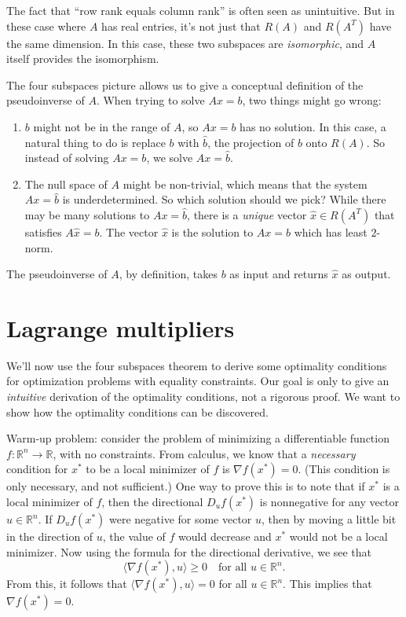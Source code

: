 \documentclass{article}
\begin{document}
The fact that ``row rank equals column rank'' is often seen as unintuitive.
But in these case where $A$ has real entries, it's not just that
$R(A)$ and $R(A^T)$ have the same dimension.  In this case,
these two subspaces are \emph{isomorphic}, and $A$ itself provides 
the isomorphism.

The four subspaces picture allows us to give a conceptual definition
of the pseudoinverse of $A$.
When trying to solve $Ax = b$, two things might go wrong:
\begin{enumerate}
\item
$b$ might not be in the range of $A$, so $Ax = b$
has no solution.  In this case, a natural thing to do
is replace $b$ with $\hat{b}$, the projection of $b$ onto $R(A)$.
So instead of solving $Ax = b$, we solve $Ax = \hat{b}$.
\item
The null space of $A$ might be non-trivial,
which means that the system $Ax = \hat{b}$ is underdetermined.
So which solution should we pick?  
While there may be many solutions to $Ax = \hat{b}$,
there is a \emph{unique} vector $\hat{x} \in R(A^T)$
that satisfies $A\hat{x} = b$.
The vector $\hat{x}$ is the solution to $Ax = b$ which has
least $2$-norm.
\end{enumerate}
The pseudoinverse of $A$, by definition,
takes $b$ as input and returns $\hat{x}$ as output.

\section{Lagrange multipliers}

We'll now use the four subspaces theorem to derive some optimality conditions
for optimization problems with equality constraints.  Our goal is only to give
 an \emph{intuitive} derivation of the optimality conditions, not a rigorous proof.
We want to show how the optimality conditions can be discovered.

Warm-up problem: consider the problem of minimizing a differentiable function
$f:\mathbb R^n \to \mathbb R$, with no constraints.  From calculus, we know
that a \emph{necessary} condition for $x^*$ to be a local minimizer of $f$
is $\nabla f(x^*) = 0$.  (This condition is only necessary, and not sufficient.)
One way to prove this is to note that if $x^*$ is a local minimizer
of $f$, then the directional $D_u f(x^*)$ is nonnegative for any vector $u \in \mathbb R^n$.
If $D_u f(x^*)$ were negative for some vector $u$, then by moving a little bit in the direction
of $u$, the value of $f$ would decrease and $x^*$ would not be a local minimizer.
Now using the formula for the directional derivative, we see that
\begin{equation*}
\langle \nabla f(x^*), u \rangle \geq 0 \quad \text{for all } u \in \mathbb R^n.
\end{equation*}
From this, it follows that $\langle \nabla f(x^*), u \rangle = 0$ for all $u \in \mathbb R^n$.
This implies that $\nabla f(x^*) = 0$.
\end{document}
